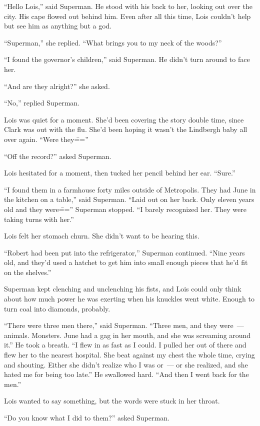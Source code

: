 ``Hello Lois,'' said Superman. He stood with his back to her, looking
out over the city. His cape flowed out behind him. Even after all this
time, Lois couldn't help but see him as anything but a god.

``Superman,'' she replied. ``What brings you to my neck of the woods?''

``I found the governor's children,'' said Superman. He didn't turn
around to face her.

``And are they alright?'' she asked.

``No,'' replied Superman.

Lois was quiet for a moment. She'd been covering the story double time,
since Clark was out with the flu. She'd been hoping it wasn't the
Lindbergh baby all over again. ``Were they\===''

``Off the record?'' asked Superman.

Lois hesitated for a moment, then tucked her pencil behind her ear.
``Sure.''

``I found them in a farmhouse forty miles outside of Metropolis. They
had June in the kitchen on a table,'' said Superman. ``Laid out on her
back. Only eleven years old and they were\==='' Superman stopped. ``I
barely recognized her. They were taking turns with her.''

Lois felt her stomach churn. She didn't want to be hearing this.

``Robert had been put into the refrigerator,'' Superman continued.
``Nine years old, and they'd used a hatchet to get him into small enough
pieces that he'd fit on the shelves.''

Superman kept clenching and unclenching his fists, and Lois could only
think about how much power he was exerting when his knuckles went white.
Enough to turn coal into diamonds, probably.

``There were three men there,'' said Superman. ``Three men, and they
were~--- animals. Monsters. June had a gag in her mouth, and she was
screaming around it.'' He took a breath. ``I flew in as fast as I could.
I pulled her out of there and flew her to the nearest hospital. She beat
against my chest the whole time, crying and shouting. Either she didn't
realize who I was or~--- or she realized, and she hated me for being too
late.'' He swallowed hard. ``And then I went back for the men.''

Lois wanted to say something, but the words were stuck in her throat.

``Do you know what I did to them?'' asked Superman.

